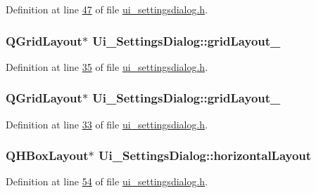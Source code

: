 Definition at line \hyperlink{a00141_source_l00047}{47} of file \hyperlink{a00141_source}{ui\+\_\+settingsdialog.\+h}.

\hypertarget{a00082_a7b71d6038a34f600625f007630c5234e}{
\subsubsection[{grid\+Layout\+\_\+2}]{\setlength{\rightskip}{0pt plus 5cm}Q\+Grid\+Layout$\ast$ Ui\+\_\+\+Settings\+Dialog\+::grid\+Layout\+\_}}\label{a00082_a7b71d6038a34f600625f007630c5234e}


Definition at line \hyperlink{a00141_source_l00035}{35} of file \hyperlink{a00141_source}{ui\+\_\+settingsdialog.\+h}.

\hypertarget{a00082_a2cc53955b73f22f0cfcf508da4654b16}{
\subsubsection[{grid\+Layout\+\_\+3}]{\setlength{\rightskip}{0pt plus 5cm}Q\+Grid\+Layout$\ast$ Ui\+\_\+\+Settings\+Dialog\+::grid\+Layout\+\_}}\label{a00082_a2cc53955b73f22f0cfcf508da4654b16}


Definition at line \hyperlink{a00141_source_l00033}{33} of file \hyperlink{a00141_source}{ui\+\_\+settingsdialog.\+h}.

\hypertarget{a00082_a5519b84cf0fd4124e77643ce5600a251}{
\subsubsection[{horizontal\+Layout}]{\setlength{\rightskip}{0pt plus 5cm}Q\+H\+Box\+Layout$\ast$ Ui\+\_\+\+Settings\+Dialog\+::horizontal\+Layout}}\label{a00082_a5519b84cf0fd4124e77643ce5600a251}


Definition at line \hyperlink{a00141_source_l00054}{54} of file \hyperlink{a00141_source}{ui\+\_\+settingsdialog.\+h}.

